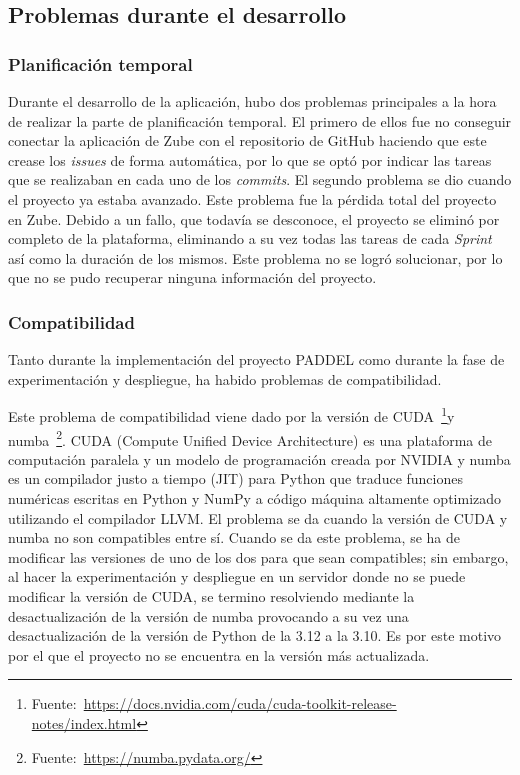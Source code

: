 \subsection{Problemas durante el desarrollo}

\subsubsection{Planificación temporal}

Durante el desarrollo de la aplicación, hubo dos problemas principales a la hora de realizar la parte de planificación temporal. El primero de ellos fue no conseguir conectar la aplicación de Zube con el repositorio de GitHub haciendo que este crease los \textit{issues} de forma automática, por lo que se optó por indicar las tareas que se realizaban en cada uno de los \textit{commits}. El segundo problema se dio cuando el proyecto ya estaba avanzado. Este problema fue la pérdida total del proyecto en Zube. Debido a un fallo, que todavía se desconoce, el proyecto se eliminó por completo de la plataforma, eliminando a su vez todas las tareas de cada \textit{Sprint} así como la duración de los mismos. Este problema no se logró solucionar, por lo que no se pudo recuperar ninguna información del proyecto.

\subsubsection{Compatibilidad}

Tanto durante la implementación del proyecto PADDEL como durante la fase de experimentación y despliegue, ha habido problemas de compatibilidad.

Este problema de compatibilidad viene dado por la versión de CUDA~\footnote{Fuente:~\url{https://docs.nvidia.com/cuda/cuda-toolkit-release-notes/index.html}}y numba~\footnote{Fuente:~\url{https://numba.pydata.org/}}. CUDA (Compute Unified Device Architecture) es una plataforma de computación paralela y un modelo de programación creada por NVIDIA y numba es un compilador justo a tiempo (JIT) para Python que traduce funciones numéricas escritas en Python y NumPy a código máquina altamente optimizado utilizando el compilador LLVM. El problema se da cuando la versión de CUDA y numba no son compatibles entre sí. Cuando se da este problema, se ha de modificar las versiones de uno de los dos para que sean compatibles; sin embargo, al hacer la experimentación y despliegue en un servidor donde no se puede modificar la versión de CUDA, se termino resolviendo mediante la desactualización de la versión de numba provocando a su vez una desactualización de la versión de Python de la 3.12 a la 3.10. Es por este motivo por el que el proyecto no se encuentra en la versión más actualizada.


